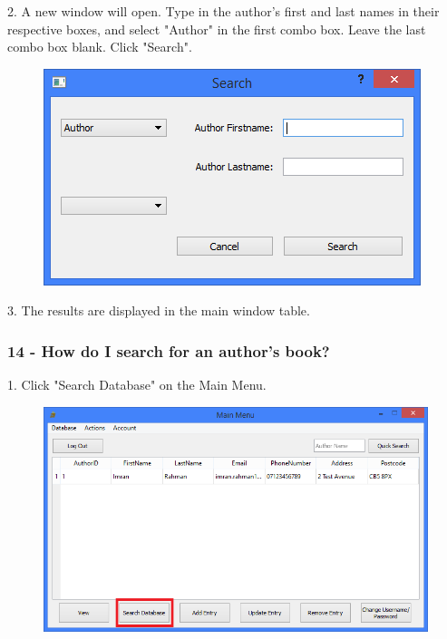 2. A new window will open. Type in the author's first and last names in their respective boxes, and select "Author" in the first combo box. Leave the last combo box blank. Click "Search".

\begin{figure}[H]
    \includegraphics[width=\textwidth]{./Manual/Tutorial/Q13/SearchDatabaseWindow.png}
\end{figure}

3. The results are displayed in the main window table.

\subsubsection{14 - How do I search for an author's book?}

1. Click "Search Database" on the Main Menu.

\begin{figure}[H]
    \includegraphics[width=\textwidth]{./Manual/Tutorial/Q13/SearchDatabase.png}
\end{figure}

